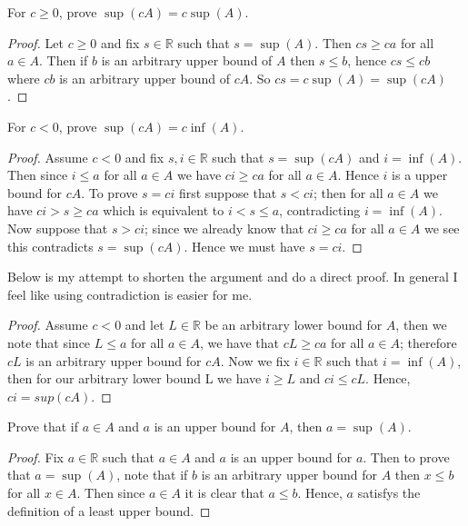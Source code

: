 \documentclass[11pt,largemargins]{homework}
\newcommand{\R}{\mathbb{R}}
\begin{document}
\begin{alphaparts}
    \questionpart
    For $c \geq 0$, prove $\sup(cA) = c\sup(A)$. 

    \begin{proof}
        Let $c  \geq 0$ and fix $s \in \R$ such that $s = \sup(A)$. Then $cs \geq ca $ for all $a \in A$. Then if $b$ is an arbitrary upper bound of $A$ then 
        $s \leq b$, hence $cs \leq cb$ where $cb$ is an arbitrary upper bound of $cA$. So  $cs = c\sup(A) = \sup(cA)$.
    \end{proof}

    \questionpart
    For $c < 0$, prove $\sup(cA) = c\inf(A)$. 

    \begin{proof}
        Assume $c < 0 $ and fix $s, i \in \R$ such that $s = \sup(cA)$ and $i = \inf(A)$. Then since $i \leq a$ for all $a \in A$ we have 
        $ci \geq ca$ for all $a \in A$. Hence $i$ is a upper bound for $cA$. To prove $s = ci$ first suppose that $s < ci$; then
        for all $a \in A$ we have $ci > s \geq ca$ which is equivalent to $i < s \leq a$, contradicting $i = \inf(A)$. Now suppose that 
        $s > ci$; since we already know that $ci \geq ca$ for all $a \in A$ we see this contradicts $s = \sup(cA)$. Hence we must have $s = ci$. 

    \end{proof}

    Below is my attempt to shorten the argument and do a direct proof. In general I feel like using contradiction is easier for me. 
    \begin{proof}
        Assume $c < 0$ and let $L \in \R$ be an arbitrary lower bound for $A$, then we note that since $L \leq a$ for all $a \in A$, we have that 
        $cL \geq ca$ for all $a \in A$; therefore $cL$ is an arbitrary upper bound for $cA$. Now we fix $i \in \R$ such that $i = \inf(A)$, then for our arbitrary lower bound L we have $i \geq L$ and $ci \leq cL$. Hence, $ci = sup(cA)$. 
    \end{proof}
\end{alphaparts}

\question
Prove that if $a \in A$ and $a$ is an upper bound for $A$, then $a = \sup(A)$. 

\begin{proof}
    Fix $a \in \R$ such that $a \in A$ and $a$ is an upper bound for $a$. Then to prove that $a = \sup(A)$, note that 
    if $b$ is an arbitrary upper bound for $A$ then $x \leq b$ for all $x \in A$. Then since $a \in A$ it is clear that $a \leq b$. 
    Hence, $a$ satisfys the definition of a least upper bound. 
\end{proof}
\end{document}
